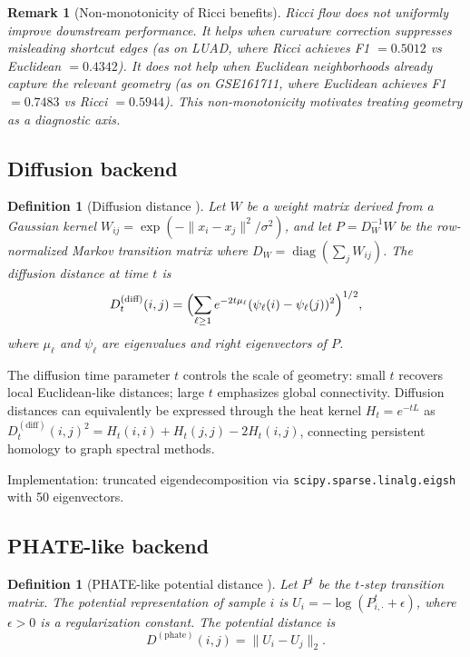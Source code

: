\documentclass[11pt]{article}
\newtheorem{definition}[theorem]{Definition}
\newtheorem{remark}[theorem]{Remark}
\begin{document}
\begin{remark}[Non-monotonicity of Ricci benefits]\label{rem:supp_ricci_nonmono}
Ricci flow does not uniformly improve downstream performance.
It helps when curvature correction suppresses misleading shortcut edges (as on LUAD, where Ricci achieves F1 $= 0.5012$ vs Euclidean $= 0.4342$).
It does not help when Euclidean neighborhoods already capture the relevant geometry (as on GSE161711, where Euclidean achieves F1 $= 0.7483$ vs Ricci $= 0.5944$).
This non-monotonicity motivates treating geometry as a diagnostic axis.
\end{remark}

\subsection{Diffusion backend}

\begin{definition}[Diffusion distance \cite{coifman2006diffusion}]\label{def:supp_diffusion}
Let $W$ be a weight matrix derived from a Gaussian kernel $W_{ij} = \exp(-\|x_i - x_j\|^2 / \sigma^2)$, and let $P = D_W^{-1} W$ be the row-normalized Markov transition matrix where $D_W = \operatorname{diag}(\sum_j W_{ij})$.
The \emph{diffusion distance} at time $t$ is
\[
D^{(\text{diff})}_{t}(i,j) = \Bigl( \sum_{\ell \ge 1} e^{-2t\mu_\ell} (\psi_\ell(i) - \psi_\ell(j))^2 \Bigr)^{1/2},
\]
where $\mu_\ell$ and $\psi_\ell$ are eigenvalues and right eigenvectors of $P$.
\end{definition}

The diffusion time parameter $t$ controls the scale of geometry: small $t$ recovers local Euclidean-like distances; large $t$ emphasizes global connectivity.
Diffusion distances can equivalently be expressed through the heat kernel $H_t = e^{-tL}$ as $D^{(\text{diff})}_t(i,j)^2 = H_t(i,i) + H_t(j,j) - 2H_t(i,j)$, connecting persistent homology to graph spectral methods.

Implementation: truncated eigendecomposition via \texttt{scipy.sparse.linalg.eigsh} with 50 eigenvectors.

\subsection{PHATE-like backend}

\begin{definition}[PHATE-like potential distance \cite{moon2019phate}]\label{def:supp_phate}
Let $P^t$ be the $t$-step transition matrix.
The \emph{potential representation} of sample $i$ is $U_i = -\log(P^t_{i,\cdot} + \epsilon)$, where $\epsilon > 0$ is a regularization constant.
The \emph{potential distance} is
\[
D^{(\text{phate})}(i,j) = \|U_i - U_j\|_2.
\]
\end{definition}
\end{document}
